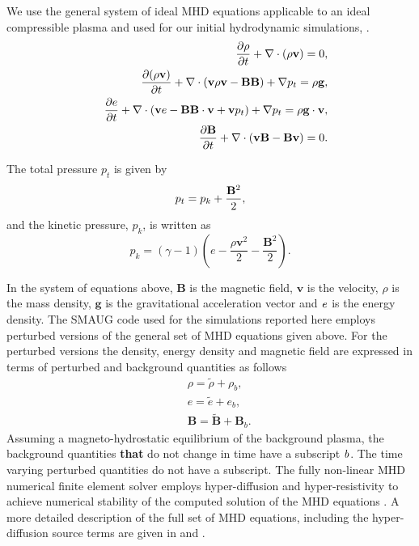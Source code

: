 \documentclass[physics,article,submit,pdftex,moreauthors]{Definitions/mdpi}
\begin{document}
We use the 
general system of ideal MHD equations applicable to an ideal compressible plasma and used for our initial hydrodynamic simulations, \cite{Griffiths2018b}.
\begin{eqnarray}
&& {{\partial \rho}\over{\partial t}}+\nabla\cdot\left( \rho{\mathbf v}\right)=0, \label{e1} \\
&& {{\partial ( \rho {\bf v})}\over{\partial t}}+\nabla\cdot\left( {\bf v}\rho {\bf v}-{\bf B B}\right)+\nabla p_t=\rho{\bf g}, \label{e2}\\
&& \frac{\partial e}{\partial t}+\nabla\cdot\left({\bf v}e-{\bf B B}\cdot{\bf v}+{\bf v}p_{t}\right)+\nabla p_t=\rho{\bf g}\cdot{\bf v}, \label{e3} \\
&& {{\partial{\bf B}}\over{\partial t}} +\nabla \cdot\left(  {\bf vB}-{\bf Bv}\right)=0. \label{e4}
\end{eqnarray}

\noindent
The total pressure $p_{t}$ is given by
\begin{equation}
p_{t}=p_{k}+{{\bf B}^{2}\over{2}}, \label{e5}
\end{equation}
and the kinetic pressure, $p_k$, is written as
\begin{equation}
p_{k}=\left(\gamma -1\right)\left(e-\frac{\rho {\mathbf v}^{2}}{2}-\frac{{\mathbf B}^{2}}{2}\right). \label{e6}
\end{equation}

In the system of equations above,  $\mathbf B$ is the magnetic field, $\mathbf v$ is the velocity, $\rho$ is the mass density, $\mathbf g$ is the gravitational acceleration vector  and  $\it{e}$ is the energy density. The SMAUG code used for the simulations reported here employs perturbed versions of the general set of MHD equations given above. For the perturbed versions the density,  energy density and magnetic field are expressed in terms of perturbed and background quantities as follows
\begin{eqnarray}
&& \rho = \tilde{\rho}+\rho_b, \nonumber \\
&& e = \tilde{e}+e_b,  \nonumber \\
&& {\mathbf B} = \tilde{\mathbf B}+{\mathbf B}_b.  \nonumber 
\end{eqnarray}
Assuming a magneto-hydrostatic equilibrium of the background plasma, the background quantities {\bf that} do not change in time have a subscript $\it{b}$. The time varying perturbed quantities do not have a subscript. The fully non-linear MHD numerical finite element solver employs hyper-diffusion and hyper-resistivity to achieve numerical stability of the computed solution of the MHD equations \cite{Caunt2001}. A more detailed description of the full set of MHD equations, including the hyper-diffusion source terms are given in \cite{Griffiths2015} and \cite{Shelyag2008}.
\end{document}
